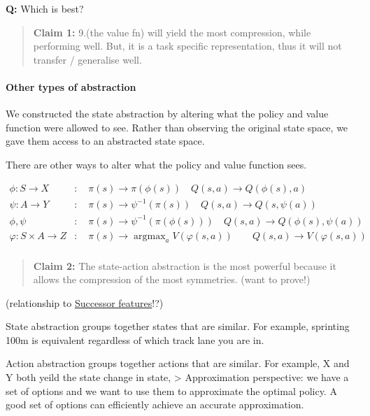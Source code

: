 \textbf{Q:} Which is best?

\begin{quote}
\textbf{Claim 1:} 9.(the value fn) will yield the most compression,
while performing well. But, it is a task specific representation, thus
it will not transfer / generalise well.
\end{quote}

\hypertarget{other-types-of-abstraction}{%
\paragraph{Other types of
abstraction}\label{other-types-of-abstraction}}

We constructed the state abstraction by altering what the policy and
value function were allowed to see. Rather than observing the original
state space, we gave them access to an abstracted state space.

There are other ways to alter what the policy and value function sees.


\begin{align}
\phi: S \to X&: \quad \pi(s) \to \pi(\phi(s)) \quad Q(s, a) \to Q(\phi(s), a) \tag{State abstraction} \\
\psi: A\to Y&: \quad \pi(s) \to \psi^{-1}(\pi(s)) \quad Q(s, a) \to Q(s, \psi(a)) \tag{Action abstraction} \\
\phi, \psi&: \quad \pi(s) \to \psi^{-1}(\pi(\phi(s))) \quad Q(s, a) \to Q(\phi(s), \psi(a)) \tag{State and action abstraction} \\
\varphi: S \times A \to Z&: \quad \pi(s)\to \mathop{\text{argmax}}_a V(\varphi(s, a)) \quad\quad Q(s, a) \to V(\varphi(s, a)) \tag{State-action abstraction} \\
\end{align}


\begin{quote}
\textbf{Claim 2:} The state-action abstraction is the most powerful
because it allows the compression of the most symmetries. (want to
prove!)
\end{quote}

(relationship to
\href{http://www.gatsby.ucl.ac.uk/~dayan/papers/d93b.pdf}{Successor
features}!?)

State abstraction groups together states that are similar. For example,
sprinting 100m is equivalent regardless of which track lane you are in.

Action abstraction groups together actions that are similar. For
example, X and Y both yeild the state change in state, \textgreater{}
Approximation perspective: we have a set of options and we want to use
them to approximate the optimal policy. A good set of options can
efficiently achieve an accurate approximation.

